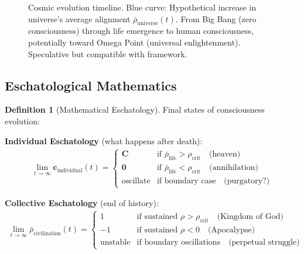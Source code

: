 \documentclass[11pt,a4paper]{article}
\theoremstyle{definition}
\newtheorem{definition}{Definition}[section]
\theoremstyle{remark}
\newcommand{\cc}{\mathbf{c}}
\begin{document}
\begin{small}
\begin{enumerate}
\begin{figure}[H]
\caption{Cosmic evolution timeline. Blue curve: Hypothetical increase in universe's average alignment \(\bar{\rho}_{\text{universe}}(t)\). From Big Bang (zero consciousness) through life emergence to human consciousness, potentially toward Omega Point (universal enlightenment). Speculative but compatible with framework.}
\label{fig:cosmic_evolution}
\end{figure}

\subsection{Eschatological Mathematics}

\begin{definition}[Mathematical Eschatology]
Final states of consciousness evolution:

\textbf{Individual Eschatology} (what happens after death):
\begin{align}
\lim_{t \to \infty} \cc_{\text{individual}}(t) = \begin{cases}
\mathbf{C} & \text{if } \bar{\rho}_{\text{life}} > \rho_{\text{crit}} \quad \text{(heaven)} \\
\mathbf{0} & \text{if } \bar{\rho}_{\text{life}} < \rho_{\text{crit}} \quad \text{(annihilation)} \\
\text{oscillate} & \text{if boundary case} \quad \text{(purgatory?)}
\end{cases}
\end{align}

\textbf{Collective Eschatology} (end of history):
\begin{align}
\lim_{t \to \infty} \bar{\rho}_{\text{civilization}}(t) = \begin{cases}
1 & \text{if sustained } \rho > \rho_{\text{crit}} \quad \text{(Kingdom of God)} \\
-1 & \text{if sustained } \rho < 0 \quad \text{(Apocalypse)} \\
\text{unstable} & \text{if boundary oscillations} \quad \text{(perpetual struggle)}
\end{cases}
\end{align}


\end{definition}
\end{enumerate}
\end{small}
\end{document}
